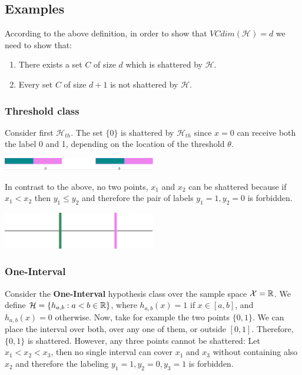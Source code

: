 \documentclass[11pt]{article}
\newcommand{\Hc}{\mathcal{H}}
\begin{document}
\subsection*{Examples}
According to the above definition, in order to show that $VCdim(\Hc) = d$ we need to show that:
\begin{enumerate}
\item There exists a set $C$ of size $d$ which is shattered by $\Hc$.
\item Every set $C$ of size $d+1$ is not shattered by $\Hc$.
\end{enumerate}

\subsubsection*{Threshold class}
Consider first $\Hc_{th}$. The set $\{0\}$ is shattered by  $\Hc_{th}$ since $x=0$ can receive both the label 0 and 1, depending on the location of the threshold $\theta$. 

\begin{center}
 \includegraphics[width=0.5\textwidth,height=0.05\textheight]{ThresholdVC1.png}
\end{center}

In contrast to the above, no two points, $x_1$ and $x_2$ can be shattered because if $x_1 < x_2$ then $y_1 \leq y_2$ and therefore the pair of labels $y_1=1, y_2=0$ is forbidden.

\begin{center}
 \includegraphics[width=0.5\textwidth,height=0.05\textheight]{ThresholdVC2.png}
\end{center}

\subsubsection*{One-Interval}
Consider the \textbf{One-Interval} hypothesis class over the sample space 
$\mathcal{X} = \mathbb{R}$. We define $\Hc = \{ h_{a,b} : a < b \in \reals\}$, where $h_{a,b}(x)=1$ if $x \in [a,b]$, and $h_{a,b}(x)=0$ otherwise.
Now, take for example the two points $\{0,1\}$.  We can place the interval over both, over any one of them, or outside $[0, 1]$. Therefore, $\{0,1\}$ is shattered. However, any three points cannot be shattered:
Let $x_1 < x_2 < x_3$, then no single interval can cover $x_1$ and $x_3$ without containing also $x_2$ and therefore the labeling $y_1=1, y_2=0, y_3=1$ is forbidden.
\end{document}
